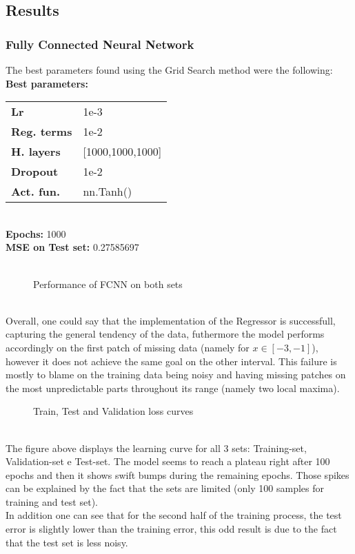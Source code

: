 \documentclass[11pt,a4paper,twocolumn]{IEEEtran}
\newcommand{\thinsepline}{\noindent\makebox[\linewidth]{\rule{7.5cm}{0.02pt}}}
\newcommand{\thinnersepline}{\noindent\makebox[\linewidth]{\rule{7.5cm}{0.01pt}}}
\begin{document}
			\subsection{\textbf{Results}}
				\subsubsection{Fully Connected Neural Network}
				The best parameters found using the Grid Search method were the following:
				\thinsepline\\
				\textbf{Best parameters:}\medskip\\
				\begin{tabular}{ll}
					\textbf{Lr}	& 1e-3 \\
					\textbf{Reg. terms}	& 1e-2 \\
					\textbf{H. layers} & [1000,1000,1000] \\
					\textbf{Dropout} & 1e-2 \\
					\textbf{Act. fun.} & nn.Tanh() \\
				\end{tabular}
				\thinnersepline\\
				\textbf{Epochs:} 1000\\
				\textbf{MSE on Test set:} 0.27585697\vspace*{-.2cm}\\
				\thinsepline\vspace*{-.7cm}\\
				\begin{figure}[h]
					\centering
					
					\caption{Performance of FCNN on both sets}
				\end{figure}\\
				Overall, one could say that the implementation of the Regressor is successfull, capturing the general tendency of the data, futhermore the model performs accordingly on the first patch of missing data (namely for $x\in[-3,-1]$), however it does not achieve the same goal on the other interval. This failure is mostly to blame on the training data being noisy and having missing patches on the most unpredictable parts throughout its range (namely two local maxima).
				\begin{figure}[h]
					\centering
					
					\caption{Train, Test and Validation loss curves}
				\end{figure}\\
				The figure above displays the learning curve for all 3 sets: Training-set, Validation-set e Test-set. The model seems to reach a plateau right after 100 epochs and then it shows swift bumps during the remaining epochs. Those spikes can be explained by the fact that the sets are limited (only 100 samples for training and test set).\\ In addition one can see that for the second half of the training process, the test error is slightly lower than the training error, this odd result is due to the fact that the test set is less noisy.\\ 
\end{document}
